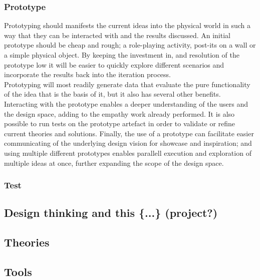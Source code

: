 \documentclass[a4paper,11pt]{article}
\newcounter{counterTODO}\setcounter{counterTODO}{1}
\newcommand\TODO[2][]{%
  \ifshowTodo{%
    \def\varTODOtext{\textcolor{purple}{\texttt{<}\textbf{TODO}\#\arabic{counterTODO}\texttt{: #2>}}}
    \def\varTODOContentLine{\textcolor{purple}{#2}}
    \ifthenelse{\isempty{#1}}%
      {%
        \addcontentsline{tocTODO}{section}{\vspace{-0.3cm}\varTODOContentLine}%
        \varTODOtext\\%
      }%
      {%
        \addcontentsline{tocTODO}{section}{\vspace{-0.3cm}\sout{\varTODOContentLine}}%
      }%
      \stepcounter{counterTODO}%
  }\fi%
}
\newif\ifshowTodo
\begin{document}
    \subsubsection{Prototype}

      Prototyping should manifests the current ideas into the physical world in
      such a way that they can be interacted with and the results discussed. An
      initial prototype should be cheap and rough; a role-playing activity,
      post-its on a wall or a simple physical object. By keeping the investment
      in, and resolution of the prototype low it will be easier to quickly explore
      different scenarios and incorporate the results back into the iteration
      process. \\

      Prototyping will most readily generate data that evaluate the pure
      functionality of the idea that is the basis of it, but it also has several
      other benefits. Interacting with the prototype enables a deeper
      understanding of the users and the design space, adding to the empathy
      work already performed. It is also possible to run tests on the prototype
      artefact in order to validate or refine current theories and solutions.
      Finally, the use of a prototype can facilitate easier communicating of the
      underlying design vision for showcase and inspiration; and using
      multiple different prototypes enables parallell execution and exploration
      of multiple ideas at once, further expanding the scope of the design
      space.

    \subsubsection{Test}

    \TODO[]{Figure the correct word for '<this current document>'}
  \subsection{Design thinking and this \{...\} (project?)}

    \TODO[]{How is design thinking used in this <project?{>}}

  \subsection{Theories}
    \TODO[]{Finish Theories}
  \subsection{Tools}
    \TODO[]{Finish Tools}
\end{document}
